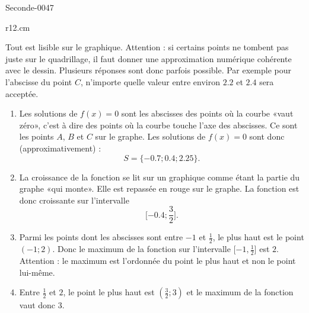 
\begin{corrige}{Seconde-0047}


\begin{wrapfigure}[7]{r}{12.cm}
   \vspace{-1.5cm}        %
   \centering
   
\end{wrapfigure}

    Tout est lisible sur le graphique. Attention : si certains points ne tombent pas juste sur le quadrillage, il faut donner une approximation numérique cohérente avec le dessin. Plusieurs réponses sont donc parfois possible. Par exemple pour l'abscisse du point \( C\), n'importe quelle valeur entre environ \( 2.2\) et \( 2.4\) sera acceptée.
    \begin{enumerate}
        \item
            Les solutions de \( f(x)=0\) sont les abscisses des points où la courbe «vaut zéro», c'est à dire des points où la courbe touche l'axe des abscisses. Ce sont les points \( A\), \( B\) et \( C\) sur le graphe. Les solutions de \( f(x)=0\) sont donc (approximativement) :
            \begin{equation}
                S=\{ -0.7;0.4;2.25 \}.
            \end{equation}
        \item
            La croissance de la fonction se lit sur un graphique comme étant la partie du graphe «qui monte». Elle est repassée en rouge sur le graphe. La fonction est donc croissante sur l'intervalle
            \begin{equation}
                \mathopen[ -0.4 ; \frac{ 3 }{2} \mathclose].
            \end{equation}
        \item
            Parmi les points dont les abscisses sont entre \( -1\) et \( \frac{ 1 }{2}\), le plus haut est le point \( (-1;2)\). Donc le maximum de la fonction sur l'intervalle \( \mathopen[ -1 , \frac{ 1 }{2} \mathclose]\) est \( 2\). Attention : le maximum est l'ordonnée du point le plus haut et non le point lui-même.
        \item
            Entre \( \frac{ 1 }{2}\) et \( 2\), le point le plus haut est \( (\frac{ 3 }{2};3)\) et le maximum de la fonction vaut donc \( 3\).

\end{enumerate}
\end{corrige}
